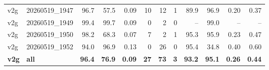 \begin{table}[t]
\begin{tabular}{llrrrrrrrrrr}
v2g & 20260519\_1947 & 96.7 & 57.5 & 0.09 & 10 & 12 & 1 & 89.9 & 96.9 & 0.20 & 0.37 \\
v2g & 20260519\_1949 & 99.4 & 99.7 & 0.09 & 0 & 2 & 0 & -- & 99.0 & -- & -- \\
v2g & 20260519\_1950 & 98.2 & 68.3 & 0.07 & 7 & 2 & 1 & 95.3 & 95.9 & 0.23 & 0.47 \\
v2g & 20260519\_1952 & 94.0 & 96.9 & 0.13 & 0 & 26 & 0 & 95.4 & 34.8 & 0.40 & 0.60 \\
\textbf{v2g} & \textbf{all} & \textbf{96.4} & \textbf{76.9} & \textbf{0.09} & \textbf{27} & \textbf{73} & \textbf{3} & \textbf{93.2} & \textbf{95.1} & \textbf{0.26} & \textbf{0.44} \\
\bottomrule
\end{tabular}
\end{table}
